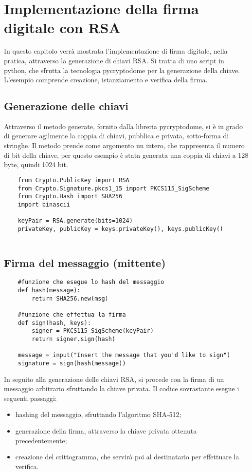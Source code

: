 \chapter{Implementazione della firma digitale con RSA}

In questo capitolo verrà mostrata l'implementazione di firma digitale, nella pratica, attraverso la generazione di chiavi RSA. Si tratta di uno script in python, che sfrutta la tecnologia pycryptodome per la generazione della chiave. L'esempio comprende creazione, istanziamento e verifica della firma.

\section{Generazione delle chiavi}

Attraverso il metodo generate, fornito dalla libreria pycryptodome, si è in grado di generare agilmente la coppia di chiavi, pubblica e privata, sotto-forma di stringhe. Il metodo prende come argomento un intero, che rappresenta il numero di bit della chiave, per questo esempio è stata generata una coppia di chiavi a 128 byte, quindi 1024 bit.

\begin{lstlisting}
	from Crypto.PublicKey import RSA
	from Crypto.Signature.pkcs1_15 import PKCS115_SigScheme
	from Crypto.Hash import SHA256
	import binascii
	
	keyPair = RSA.generate(bits=1024)
	privateKey, publicKey = keys.privateKey(), keys.publicKey()
	
\end{lstlisting}

\newpage

\section{Firma del messaggio (mittente)}

\begin{lstlisting}
	#funzione che esegue lo hash del messaggio
	def hash(message):
		return SHA256.new(msg)
	
	#funzione che effettua la firma
	def sign(hash, keys):
		signer = PKCS115_SigScheme(keyPair)
		return signer.sign(hash)
	
	message = input("Insert the message that you'd like to sign")
	signature = sign(hash(message))
\end{lstlisting}

In seguito alla generazione delle chiavi RSA, si procede con la firma di un messaggio arbitrario sfruttando la chiave privata. Il codice sovrastante esegue i seguenti passaggi:
\begin{itemize}
	\item hashing del messaggio, sfruttando l'algoritmo SHA-512;
	\item generazione della firma, attraverso la chiave privata ottenuta precedentemente;
	\item creazione del crittogramma, che servirà poi al destinatario per effettuare la verifica.
\end{itemize}

